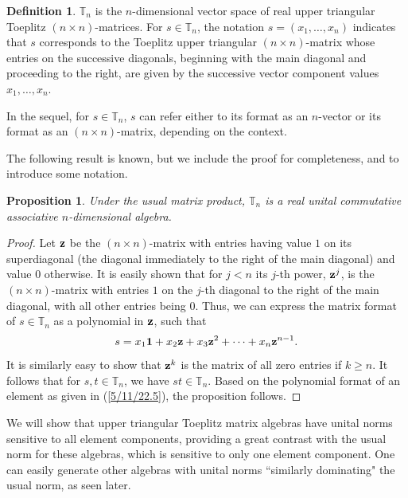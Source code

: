 \documentclass{amsart}
\numberwithin{equation}{section}
\newtheorem{proposition}[theorem]{Proposition}
\theoremstyle{definition}
\newtheorem{definition}[theorem]{Definition}
\numberwithin{theorem}{section}
\begin{document}
 \begin{definition}\label{5/4/22.1} $\mathbb{T}_n$ is the $n$-dimensional vector space of real upper triangular Toeplitz $(n\times n)$-matrices. For $s\in \mathbb{T}_n$, the notation $s=(x_1,\dots,x_n)$ indicates that $s$ corresponds to the Toeplitz upper triangular $(n\times n)$-matrix whose entries on the successive diagonals, beginning with the main diagonal and proceeding to the right, are given by the successive vector component values $x_1,\dots,x_n$.   
\end{definition}

In the sequel, for $s\in \mathbb{T}_n$, $s$ can refer either to its format as an $n$-vector or its format as an $(n\times n)$-matrix, depending on the context.


The following result is known, but we include the proof for completeness, and to introduce some notation.  



 \begin{proposition}\label{5/10/22.1} Under the usual matrix product, $\mathbb{T}_n$ is a real unital commutative associative $n$-dimensional algebra.\end{proposition} 
 
 \begin{proof}
Let ${\bf z}$ be the $(n \times n)$-matrix with entries having value $1$ on its superdiagonal  (the diagonal immediately to the right of the main diagonal) and value $0$ otherwise.  It is easily shown that for $j<n$ its $j$-th power, ${\bf z}^j$, is the $(n\times n)$-matrix with entries $1$ on the $j$-th diagonal to the right of the main diagonal, with all other entries being $0$.   Thus, we can express the matrix format of $s\in\mathbb{T}_n$ as a polynomial in ${\bf z}$, such that
\begin{equation}\label{5/11/22.5} s = x_1 {\bf 1} + x_2 {\bf z} + x_3 {\bf z}^2 + \cdots + x_n {\bf z}^{n-1}.\end{equation}  It is similarly easy to show that ${\bf z}^k$ is the matrix of all zero entries if $k\ge n$.  It follows that for $s,t\in \mathbb{T}_n$, we have $st\in \mathbb{T}_n$.   Based on the polynomial format of an element as given in (\ref{5/11/22.5}), the proposition follows.
 \end{proof}
 

We will show that upper triangular Toeplitz matrix algebras have unital norms sensitive to all element components, providing a great contrast with the usual norm for these algebras, which is sensitive to only one element component.  One can easily generate other algebras with unital norms ``similarly dominating" the usual norm, as seen later.
\end{document}
